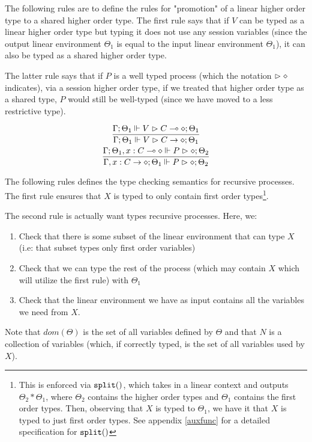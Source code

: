The following rules are to define the rules for "promotion" of a linear higher order type to a shared higher order type. The first rule says that if $V$ can be typed as a linear higher order type but typing it does not use any session variables (since the output linear environment $\Theta_1$ is equal to the input linear environment $\Theta_1$), it can also be typed as a shared higher order type.

The latter rule says that if $P$ is a well typed process (which the notation $\vartriangleright \diamond$ indicates), via a session higher order type, if we treated that higher order type as a shared type, $P$ would still be well-typed (since we have moved to a less restrictive type).

\begin{gather*}
\frac{\Gamma ; \Theta_1 \Vdash V \vartriangleright C \multimap \diamond ; \Theta_1}{\Gamma ; \Theta_1 \Vdash V \vartriangleright C \rightarrow \diamond ; \Theta_1} \\
\frac{\Gamma ; \Theta_1, x : C \multimap \diamond \Vdash P \vartriangleright \diamond ; \Theta_2}{\Gamma, x : C \rightarrow \diamond ; \Theta_1 \Vdash P \vartriangleright \diamond ; \Theta_2}
\end{gather*}


The following rules defines the type checking semantics for recursive processes. The first rule ensures that $X$ is typed to only contain first order types\footnote{This is enforced via $\splt$, which takes in a linear context and outputs $\Theta_2 * \Theta_1$, where $\Theta_2$ contains the higher order types and $\Theta_1$ contains the first order types. Then, observing that $X$ is typed to $\Theta_1$, we have it that $X$ is typed to just first order types. See appendix \ref{auxfunc} for a detailed specification for $\splt$}.

The second rule is actually want types recursive processes. Here, we:
\begin{enumerate}
    \item Check that there is some subset of the linear environment that can type $X$ (i.e: that subset types only first order variables)
    \item Check that we can type the rest of the process (which may contain $X$ which will utilize the first rule) with $\Theta_1$
    \item Check that the linear environment we have as input contains all the variables we need from $X$.
\end{enumerate}

Note that $dom(\Theta)$ is the set of all variables defined by $\Theta$ and that $N$ is a collection of variables (which, if correctly typed, is the set of all variables used by $X$).

